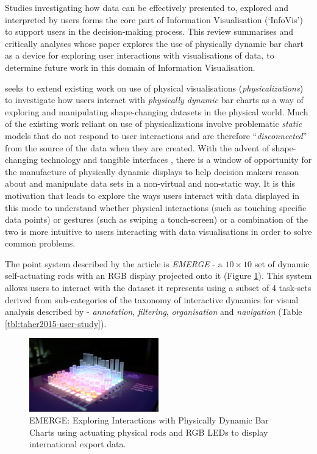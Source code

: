 \documentclass[11pt]{article}
\begin{document}

Studies investigating how data can be effectively presented to, explored and interpreted by users forms the core part of Information Visualisation (`InfoVis') to support users in the decision-making process. This review summarises and critically analyses \citet{taher2015} whose paper explores the use of physically dynamic bar chart as a device for exploring user interactions with visualisations of data, to determine future work in this domain of Information Visualisation.

\citeauthor{taher2015} seeks to extend existing work on use of physical visualisations (\textit{physicalizations}) to investigate how users interact with \textit{physically dynamic} bar charts as a way of exploring and manipulating shape-changing datasets in the physical world. Much of the existing work reliant on use of physicalizations involve problematic \textit{static} models that do not respond to user interactions \citep{jansen2013} and are therefore ``\textit{disconnected}'' from the source of the data when they are created. With the advent of shape-changing technology and tangible interfaces \citep{rasmussen2012}, there is a window of opportunity for the manufacture of physically dynamic displays to help decision makers reason about and manipulate data sets in a non-virtual and non-static way. It is this motivation that leads \citeauthor{taher2015} to explore the ways users interact with data displayed in this mode to understand whether physical interactions (such as touching specific data points) or gestures (such as swiping a touch-screen) or a combination of the two is more intuitive to users interacting with data visualisations in order to solve common problems.

The point system described by the article is \textit{EMERGE} - a $10\times10$ set of dynamic self-actuating rods with an RGB display projected onto it (Figure \ref{fig:taher2015-emerge}). This system allows users to interact with the dataset it represents using a subset of 4 task-sets derived from sub-categories of the taxonomy of interactive dynamics for visual analysis described by \citet{heer2012} - \textit{annotation}, \textit{filtering}, \textit{organisation} and \textit{navigation} (Table \ref{tbl:taher2015-user-study}).

\begin{figure}[H]
\centering
\includegraphics[width=0.5\textwidth]{img/taher2015-emerge.png} 
\caption{EMERGE: Exploring Interactions with Physically Dynamic Bar Charts using actuating physical rods and RGB LEDs to display international export data.}\label{fig:taher2015-emerge}
\end{figure}
\end{document}

